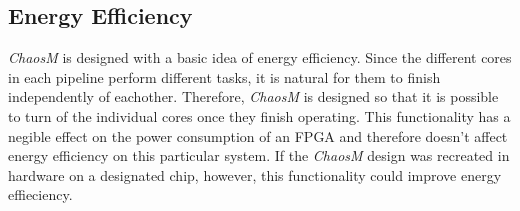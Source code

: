 \subsection{Energy Efficiency}

\textit{ChaosM} is designed with a basic idea of energy efficiency. Since the
different cores in each pipeline perform different tasks, it is natural for them
to finish independently of eachother. Therefore, \textit{ChaosM} is designed so
that it is possible to turn of the individual cores once they finish operating.
This functionality has a negible effect on the power consumption of an FPGA and
therefore doesn't affect energy efficiency on this particular system. If the
\textit{ChaosM} design was recreated in hardware on a designated chip, however,
this functionality could improve energy effieciency.
